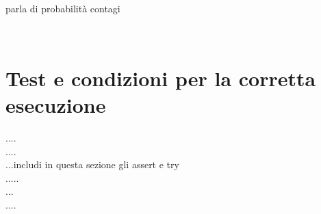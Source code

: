 \documentclass[a4paper,10 pt]{article}
\begin{document}
\ \\ parla di probabilità contagi
\begin{figure}
\centering
{} \quad {} \\
\caption{}
\label{fig:subfig}
\end{figure}

\section{Test e condizioni per la corretta esecuzione}
....
\ \\
....
\ \\
...includi in questa sezione gli assert e try 
\ \\
.....
\ \\
...
\ \\
....
\end{document}
